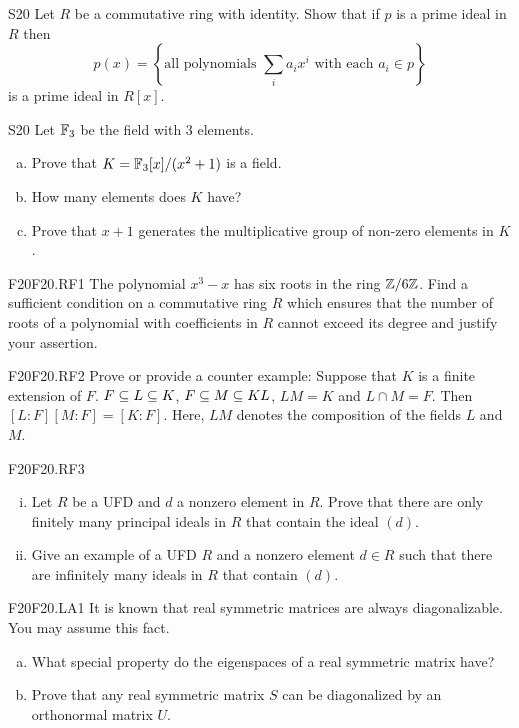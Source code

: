 \documentclass[../AlgebraQualSolutions.tex]{subfiles}
\begin{document}
	\begin{prob}{S20}{}
	Let $R$ be a commutative ring with identity. Show that if $p$ is a prime ideal in $R$ then
		\[p(x) = \left\{\textrm{all polynomials } \sum_i a_ix^i \textrm{ with each } a_i \in p \right\} \]
	is a prime ideal in $R[x]$.
	\end{prob}
	
	\begin{prob}{S20}{}
	Let $\mathbb{F}_3$ be the field with 3 elements.
	\begin{enumerate}[(a)]
	\item Prove that $K = \mathbb{F}_3[x]/(x^2 + 1)$ is a field.
	\item How many elements does $K$ have?
	\item Prove that $x+1$ generates the multiplicative group of non-zero elements in $K$.
	\end{enumerate}
	\end{prob}

	
	\begin{prob}{F20}{F20.RF1}
	The polynomial $x^3 - x$ has six roots in the ring $\mathbb{Z}/6\mathbb{Z}$. Find a sufficient condition on a commutative ring $R$ which ensures that the number of roots of a polynomial with coefficients in $R$ cannot exceed its degree and justify your assertion.
	\end{prob}
	
	\begin{prob}{F20}{F20.RF2}
	Prove or provide a counter example: Suppose that $K$ is a finite extension of $F$. $F \subseteq L \subseteq K$, $F \subseteq M \subseteq KL$, $LM = K$ and $L \cap M = F$. Then $[L:F][M:F] = [K:F]$. Here, $LM$ denotes the composition of the fields $L$ and $M$.
	\end{prob}
	
	\begin{prob}{F20}{F20.RF3}
		\begin{enumerate}[(i)]
		\item Let $R$ be a UFD and $d$ a nonzero element in $R$. Prove that there are only finitely many principal ideals  in $R$ that contain the ideal $(d)$.
		\item Give an example of a UFD $R$ and a nonzero element $d \in R$ such that there are infinitely many ideals in $R$ that contain $(d)$.
		\end{enumerate}
	\end{prob}
	
	\begin{prob}{F20}{F20.LA1}
	It is known that real symmetric matrices are always diagonalizable. You may assume this fact.
	\begin{enumerate}[(a)]
	\item What special property do the eigenspaces of a real symmetric matrix have?
	\item Prove that any real symmetric matrix $S$ can be diagonalized by an orthonormal matrix $U$.
	\end{enumerate}
	\end{prob}
	
\end{document}
